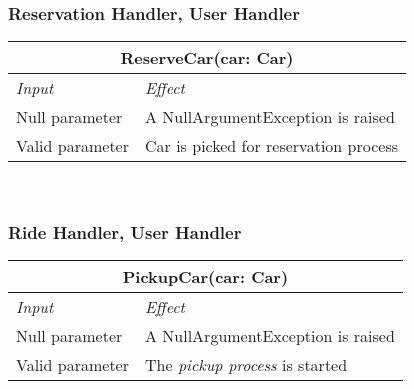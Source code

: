 			\subsubsection*{Reservation Handler, User Handler}
			\begin{tabular}{ |l|l| }
				\hline
				\multicolumn{2}{|c|}{ReserveCar(car: Car)}\\
				\hline
				\textit{Input}&\textit{Effect}\\ \hline
				Null parameter & A NullArgumentException is raised\\ \hline
				Valid parameter & Car is picked for reservation process \\ \hline
			\end{tabular}
			\\
			
			\subsubsection*{Ride Handler, User Handler}
			\begin{tabular}{ |l|l| }
				\hline
				\multicolumn{2}{|c|}{PickupCar(car: Car)}\\ %
				\hline
				\textit{Input}&\textit{Effect}\\ \hline
				Null parameter & A NullArgumentException is raised\\ \hline
				Valid parameter & The \textit{pickup process} is started \\ \hline
			\end{tabular}
			\\	
			
